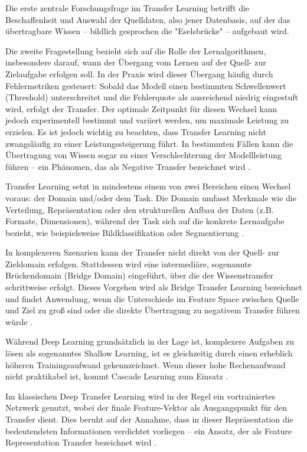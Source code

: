 Die erste zentrale Forschungsfrage im Transfer Learning betrifft die Beschaffenheit und Auswahl der Quelldaten, also jener Datenbasis, auf der 
das übertragbare Wissen – bildlich gesprochen die "Eselsbrücke" – aufgebaut wird.

Die zweite Fragestellung bezieht sich auf die Rolle der Lernalgorithmen, insbesondere darauf, wann der Übergang vom Lernen auf der Quell- zur 
Zielaufgabe erfolgen soll. In der Praxis wird dieser Übergang häufig durch Fehlermetriken gesteuert: Sobald das Modell einen bestimmten 
Schwellenwert (Threshold) unterschreitet und die Fehlerquote als ausreichend niedrig eingestuft wird, erfolgt der Transfer. Der optimale 
Zeitpunkt für diesen Wechsel kann jedoch experimentell bestimmt und variiert werden, um maximale Leistung zu erzielen. Es ist jedoch wichtig 
zu beachten, dass Transfer Learning nicht zwangsläufig zu einer Leistungssteigerung führt. In bestimmten Fällen kann die Übertragung von Wissen 
sogar zu einer Verschlechterung der Modellleistung führen – ein Phänomen, das als Negative Transfer bezeichnet wird \cite{survey_transfer}.

Transfer Learning setzt in mindestens einem von zwei Bereichen einen Wechsel voraus: der Domain und/oder dem Task. Die Domain umfasst Merkmale 
wie die Verteilung, Repräsentation oder den strukturellen Aufbau der Daten (z.B. Formate, Dimensionen), während der Task sich auf die konkrete 
Lernaufgabe bezieht, wie beispielsweise Bildklassifikation oder Segmentierung \cite{survey_transfer}.

In komplexeren Szenarien kann der Transfer nicht direkt von der Quell- zur Zieldomain erfolgen. Stattdessen wird eine intermediäre, sogenannte 
Brückendomain (Bridge Domain) eingeführt, über die der Wissenstransfer schrittweise erfolgt. Dieses Vorgehen wird als Bridge Transfer Learning 
bezeichnet und findet Anwendung, wenn die Unterschiede im Feature Space zwischen Quelle und Ziel zu groß sind oder die direkte Übertragung zu 
negativem Transfer führen würde \cite{bridge_transfer, survey_transfer}.

Während Deep Learning grundsätzlich in der Lage ist, komplexere Aufgaben zu lösen als sogenanntes Shallow Learning, ist es gleichzeitig durch 
einen erheblich höheren Trainingsaufwand gekennzeichnet. Wenn dieser hohe Rechenaufwand nicht praktikabel ist, kommt Cascade Learning zum 
Einsatz \cite{cascor}.

Im klassischen Deep Transfer Learning wird in der Regel ein vortrainiertes Netzwerk genutzt, wobei der finale Feature-Vektor als Ausgangspunkt 
für den Transfer dient. Dies beruht auf der Annahme, dass in dieser Repräsentation die bedeutendsten Informationen verdichtet vorliegen – ein 
Ansatz, der als Feature Representation Transfer bezeichnet wird \cite{survey_transfer}.

